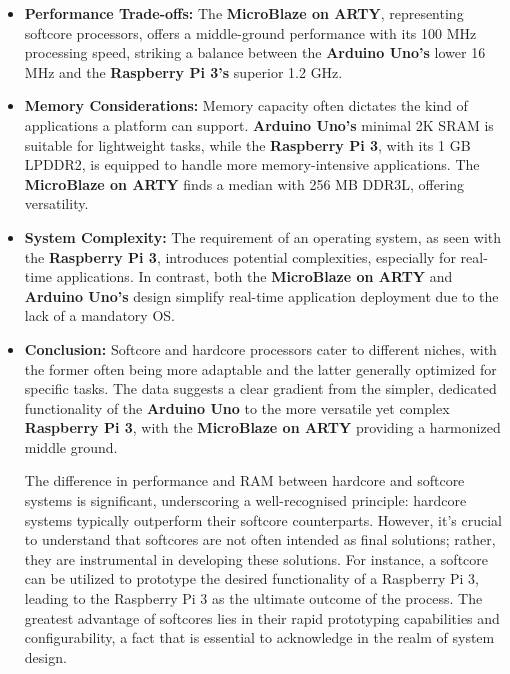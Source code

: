 \documentclass[conference]{IEEEtran}
\begin{document}
\begin{itemize}
    \item \textbf{Performance Trade-offs:} The \textbf{MicroBlaze on ARTY}, representing softcore processors, offers a middle-ground performance with its 100 MHz processing speed, striking a balance between the \textbf{Arduino Uno's} lower 16 MHz and the \textbf{Raspberry Pi 3's} superior 1.2 GHz.
    
    \item \textbf{Memory Considerations:} Memory capacity often dictates the kind of applications a platform can support. \textbf{Arduino Uno's} minimal 2K SRAM is suitable for lightweight tasks, while the \textbf{Raspberry Pi 3}, with its 1 GB LPDDR2, is equipped to handle more memory-intensive applications. The \textbf{MicroBlaze on ARTY} finds a median with 256 MB DDR3L, offering versatility.
    
    \item \textbf{System Complexity:} The requirement of an operating system, as seen with the \textbf{Raspberry Pi 3}, introduces potential complexities, especially for real-time applications. In contrast, both the \textbf{MicroBlaze on ARTY} and \textbf{Arduino Uno's} design simplify real-time application deployment due to the lack of a mandatory OS.
    
    \item \textbf{Conclusion:} Softcore and hardcore processors cater to different niches, with the former often being more adaptable and the latter generally optimized for specific tasks. The data suggests a clear gradient from the simpler, dedicated functionality of the \textbf{Arduino Uno} to the more versatile yet complex \textbf{Raspberry Pi 3}, with the \textbf{MicroBlaze on ARTY} providing a harmonized middle ground.

The difference in performance and RAM between hardcore and softcore systems is significant, underscoring a well-recognised principle: hardcore systems typically outperform their softcore counterparts. However, it's crucial to understand that softcores are not often intended as final solutions; rather, they are instrumental in developing these solutions. For instance, a softcore can be utilized to prototype the desired functionality of a Raspberry Pi 3, leading to the Raspberry Pi 3 as the ultimate outcome of the process. The greatest advantage of softcores lies in their rapid prototyping capabilities and configurability, a fact that is essential to acknowledge in the realm of system design.
\end{itemize}
\newpage
\end{document}
